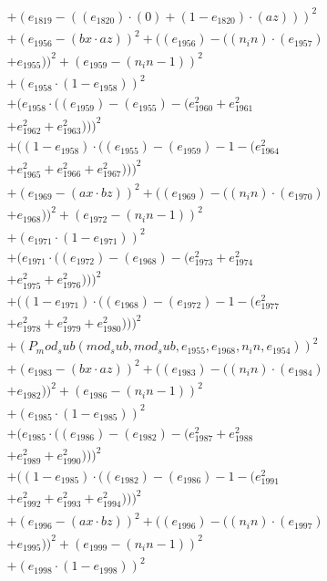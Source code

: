 \documentclass[10pt, a4paper]{article}
\begin{document}
\begin{small}
\begin{align*}
& + (e_{1819} - ((e_{1820})  \cdot  (0) + (1 - e_{1820})  \cdot  (az)))^{2} \\
& + (e_{1956} - (bx  \cdot  az))^{2} + ((e_{1956}) - ((n_in)  \cdot  (e_{1957}) \\
& + e_{1955}))^{2} + (e_{1959} - (n_in - 1))^{2} \\
& + (e_{1958}  \cdot  (1 - e_{1958}))^{2} \\
& + (e_{1958}  \cdot  ((e_{1959}) - (e_{1955}) - (e_{1960}^{2} + e_{1961}^{2} \\
& + e_{1962}^{2} + e_{1963}^{2})))^{2} \\
& + ((1 - e_{1958})  \cdot  ((e_{1955}) - (e_{1959}) - 1 - (e_{1964}^{2} \\
& + e_{1965}^{2} + e_{1966}^{2} + e_{1967}^{2})))^{2} \\
& + (e_{1969} - (ax  \cdot  bz))^{2} + ((e_{1969}) - ((n_in)  \cdot  (e_{1970}) \\
& + e_{1968}))^{2} + (e_{1972} - (n_in - 1))^{2} \\
& + (e_{1971}  \cdot  (1 - e_{1971}))^{2} \\
& + (e_{1971}  \cdot  ((e_{1972}) - (e_{1968}) - (e_{1973}^{2} + e_{1974}^{2} \\
& + e_{1975}^{2} + e_{1976}^{2})))^{2} \\
& + ((1 - e_{1971})  \cdot  ((e_{1968}) - (e_{1972}) - 1 - (e_{1977}^{2} \\
& + e_{1978}^{2} + e_{1979}^{2} + e_{1980}^{2})))^{2} \\
& + (P_mod_sub(mod_sub, mod_sub, e_{1955}, e_{1968}, n_in, e_{1954}))^{2} \\
& + (e_{1983} - (bx  \cdot  az))^{2} + ((e_{1983}) - ((n_in)  \cdot  (e_{1984}) \\
& + e_{1982}))^{2} + (e_{1986} - (n_in - 1))^{2} \\
& + (e_{1985}  \cdot  (1 - e_{1985}))^{2} \\
& + (e_{1985}  \cdot  ((e_{1986}) - (e_{1982}) - (e_{1987}^{2} + e_{1988}^{2} \\
& + e_{1989}^{2} + e_{1990}^{2})))^{2} \\
& + ((1 - e_{1985})  \cdot  ((e_{1982}) - (e_{1986}) - 1 - (e_{1991}^{2} \\
& + e_{1992}^{2} + e_{1993}^{2} + e_{1994}^{2})))^{2} \\
& + (e_{1996} - (ax  \cdot  bz))^{2} + ((e_{1996}) - ((n_in)  \cdot  (e_{1997}) \\
& + e_{1995}))^{2} + (e_{1999} - (n_in - 1))^{2} \\
& + (e_{1998}  \cdot  (1 - e_{1998}))^{2} \\

\end{align*}
\end{small}
\end{document}
